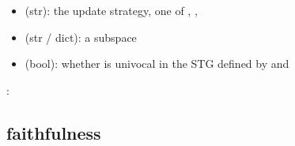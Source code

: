 \documentclass[letterpaper,10pt,english]{sphinxmanual}
\begin{document}
\begin{fulllineitems}
\begin{description}
\begin{itemize}
\item {} 
 (str): the update strategy, one of , , 

\item {} 
 (str / dict): a subspace

\end{itemize}

\item[{\sphinxstylestrong{returns}:}] \leavevmode\begin{itemize}
\item {} 
 (bool): whether  is univocal in the STG defined by  and 

\end{itemize}

\end{description}

:

\begin{sphinxVerbatim}[commandchars=\\\{\}]
   
  \PYG{p}{[}\PYG{p}{]}
  
\end{sphinxVerbatim}

\end{fulllineitems}



\subsection{faithfulness}
\label{\detokenize{Attractors:id5}}\label{\detokenize{Attractors:faithfulness}}
\end{document}
